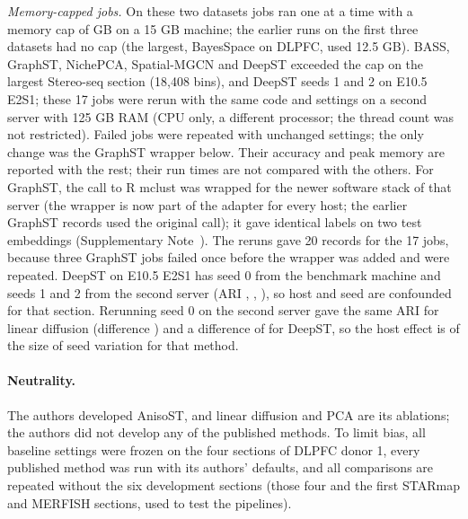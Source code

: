 \documentclass[unnumsec,webpdf,contemporary,large]{oup-authoring-template}
\begin{document}
\emph{Memory-capped jobs.} On these two datasets jobs ran one at a time with a memory
cap of \memCap{} GB on a 15 GB machine; the earlier runs on the first three datasets had no cap (the largest, BayesSpace on DLPFC,
used 12.5 GB). BASS, GraphST, NichePCA, Spatial-MGCN and DeepST exceeded the cap on the largest Stereo-seq section (18,408 bins), and
DeepST seeds 1 and 2 on E10.5 E2S1; these 17 jobs were rerun with the same code and settings on a second server with 125 GB RAM
(CPU only, a different processor; the thread count was not restricted). Failed jobs were repeated with unchanged settings; the only change was the GraphST wrapper below. Their accuracy and peak memory are reported with the rest; their run times are not compared
with the others. For GraphST, the call to R mclust was wrapped for the newer software stack of that server (the wrapper is now part of the adapter for every host; the earlier GraphST records used the original call); it gave identical labels
on two test embeddings (Supplementary Note~\SNcompute). The reruns gave 20 records for the 17 jobs, because three GraphST jobs failed once before the wrapper was added and were repeated. DeepST on E10.5 E2S1 has seed 0 from the benchmark machine and seeds 1 and 2 from the second server (ARI \deepstEtwoSeedZero{}, \deepstEtwoSeedOne{}, \deepstEtwoSeedTwo{}), so host and seed are confounded for that section. Rerunning seed 0 on the second server gave the same ARI for linear diffusion
(difference \rvAtenLin) and a difference of \rvAtenDeepst{} for DeepST, so the host effect is of the size of seed variation for that method.

\paragraph{Neutrality.} The authors developed AnisoST, and linear diffusion and PCA are its ablations; the authors did not
develop any of the published methods. To limit bias, all baseline settings were frozen on the four sections of DLPFC donor 1, every
published method was run with its authors' defaults, and all comparisons are repeated without the six development sections
(those four and the first STARmap and MERFISH sections, used to test the pipelines).
\end{document}

